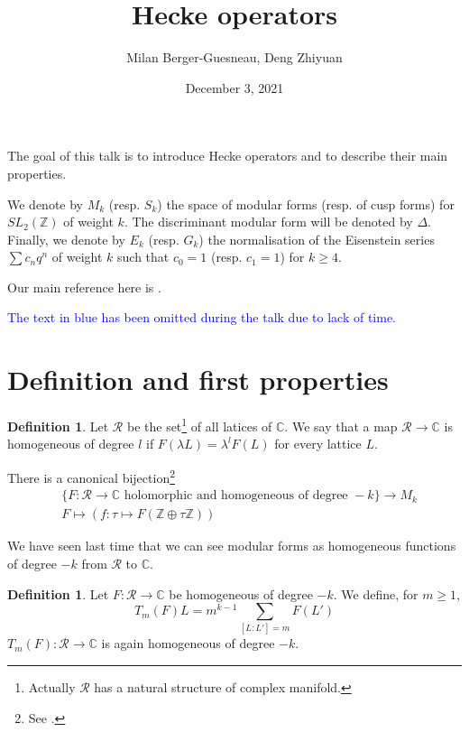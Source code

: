\documentclass[12pt,a4paper,english]{article}
\title{Hecke operators}
\date{December 3, 2021}
\author{Milan Berger-Guesneau, Deng Zhiyuan}
\theoremstyle{plain}
\theoremstyle{definition}
\newtheorem{defi}[thm]{Definition}
\begin{document}
\maketitle

\vspace{0.5cm}

The goal of this talk is to introduce Hecke operators and to describe their main properties.

We denote by $M_k$ (resp. $S_k$) the space of modular forms (resp. of cusp forms) for $SL_2(\mathbb{Z})$ of weight $k$. The discriminant modular form will be denoted by $\Delta$. Finally, we denote by $E_k$ (resp. $G_k$) the normalisation of the Eisenstein series $\sum c_n q^n$ of weight $k$ such that $c_0=1$ (resp. $c_1=1$) for $k\geqslant 4$.

Our main reference here is \cite[p.37-41]{zag}.
\vspace{0.5cm}

\textcolor{blue}{The text in blue has been omitted during the talk due to lack of time.}


\section{Definition and first properties}

\begin{defi}
Let $\mathcal{R}$ be the set\footnote{Actually $\mathcal{R}$ has a natural structure of complex manifold.} of all latices of $\mathbb{C}$. We say that a map $\mathcal{R}\to\mathbb{C}$ is homogeneous of degree $l$ if $F(\lambda L)=\lambda^l F(L)$ for every lattice $L$.
\end{defi}

There is a canonical bijection\footnote{See \cite[p.17]{RS}.}
\begin{align*}
   &\{F:\mathcal{R}\to\mathbb{C}\text{ holomorphic and homogeneous of degree }-k\}\to M_k\\
   & F\longmapsto (f:\tau\longmapsto F(\mathbb{Z}\oplus\tau\mathbb{Z}))
\end{align*}

We have seen last time that we can see modular forms as homogeneous functions of degree $-k$ from $\mathcal{R}$ to $\mathbb{C}$. 

\begin{defi}
Let $F:\mathcal{R}\to\mathbb{C}$ be homogeneous of degree $-k$. We define, for $m\geqslant 1$,
\begin{equation*}
    T_m(F)L=m^{k-1}\sum_{[L:L']=m}F\left(L'\right)
\end{equation*}
$T_m(F):\mathcal{R}\to\mathbb{C}$ is again homogeneous of degree $-k$.
\end{defi}
\end{document}
